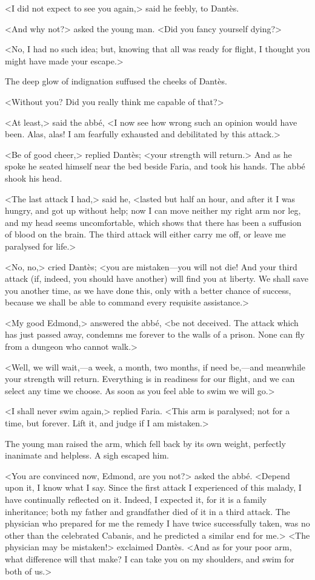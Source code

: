  <I did not expect to see you again,> said he feebly, to Dantès. 

 <And why not?> asked the young man. <Did you fancy yourself dying?> 

 <No, I had no such idea; but, knowing that all was ready for flight, I thought you might have made your escape.> 

 The deep glow of indignation suffused the cheeks of Dantès. 

 <Without you? Did you really think me capable of that?> 

 <At least,> said the abbé, <I now see how wrong such an opinion would have been. Alas, alas! I am fearfully exhausted and debilitated by this attack.> 

 <Be of good cheer,> replied Dantès; <your strength will return.> And as he spoke he seated himself near the bed beside Faria, and took his hands. The abbé shook his head. 

 <The last attack I had,> said he, <lasted but half an hour, and after it I was hungry, and got up without help; now I can move neither my right arm nor leg, and my head seems uncomfortable, which shows that there has been a suffusion of blood on the brain. The third attack will either carry me off, or leave me paralysed for life.> 

 <No, no,> cried Dantès; <you are mistaken—you will not die! And your third attack (if, indeed, you should have another) will find you at liberty. We shall save you another time, as we have done this, only with a better chance of success, because we shall be able to command every requisite assistance.> 

 <My good Edmond,> answered the abbé, <be not deceived. The attack which has just passed away, condemns me forever to the walls of a prison. None can fly from a dungeon who cannot walk.> 

 <Well, we will wait,—a week, a month, two months, if need be,—and meanwhile your strength will return. Everything is in readiness for our flight, and we can select any time we choose. As soon as you feel able to swim we will go.> 

 <I shall never swim again,> replied Faria. <This arm is paralysed; not for a time, but forever. Lift it, and judge if I am mistaken.> 

 The young man raised the arm, which fell back by its own weight, perfectly inanimate and helpless. A sigh escaped him. 

 <You are convinced now, Edmond, are you not?> asked the abbé. <Depend upon it, I know what I say. Since the first attack I experienced of this malady, I have continually reflected on it. Indeed, I expected it, for it is a family inheritance; both my father and grandfather died of it in a third attack. The physician who prepared for me the remedy I have twice successfully taken, was no other than the celebrated Cabanis, and he predicted a similar end for me.>  <The physician may be mistaken!> exclaimed Dantès. <And as for your poor arm, what difference will that make? I can take you on my shoulders, and swim for both of us.> 

